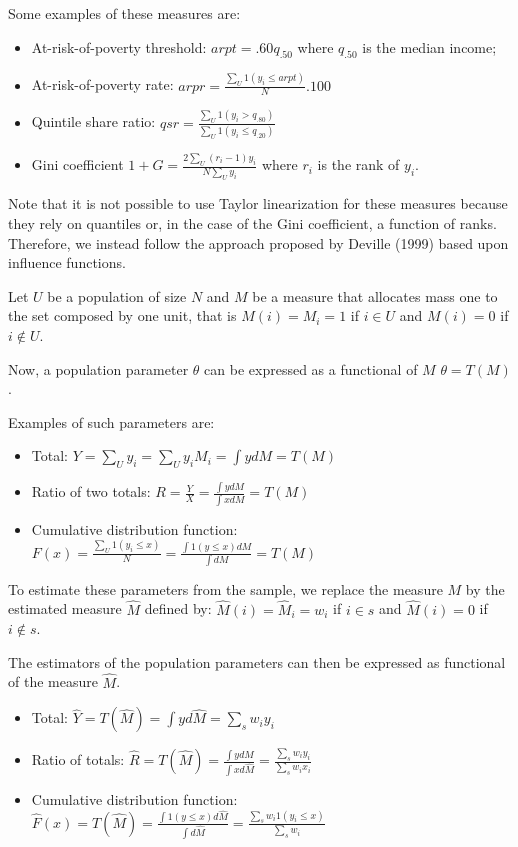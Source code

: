 \documentclass[
]{book}
\begin{document}
Some examples of these measures are:

\begin{itemize}
\item
  At-risk-of-poverty threshold:
  \(arpt=.60q_{.50}\) where \(q_{.50}\) is the median income;
\item
  At-risk-of-poverty rate:
  \(arpr=\frac{\sum_U 1(y_i \leq arpt)}{N}.100\)
\item
  Quintile share ratio:
  \(qsr=\frac{\sum_U 1(y_i>q_{.80})}{\sum_U 1(y_i\leq q_{.20})}\)
\item
  Gini coefficient
  \(1+G=\frac{2\sum_U (r_i-1)y_i}{N\sum_Uy_i}\)
  where \(r_i\) is the rank of \(y_i\).
\end{itemize}

Note that it is not possible to use Taylor linearization for these measures because they rely on quantiles or, in the case of the Gini coefficient, a function of ranks. Therefore, we instead follow the approach proposed by Deville (1999) based upon influence functions.

Let \(U\) be a population of size \(N\) and \(M\) be a measure that allocates mass one to the set composed by one unit, that is \(M(i)=M_i= 1\) if \(i\in U\) and \(M(i)=0\) if \(i\notin U\).

Now, a population parameter \(\theta\) can be expressed as a functional of \(M\)
\(\theta=T(M)\).

Examples of such parameters are:

\begin{itemize}
\item
  Total:
  \(Y=\sum_Uy_i=\sum_U y_iM_i=\int ydM=T(M)\)
\item
  Ratio of two totals:
  \(R=\frac{Y}{X}=\frac{\int y dM}{\int x dM}=T(M)\)
\item
  Cumulative distribution function:
  \(F(x)=\frac{\sum_U 1(y_i\leq x)}{N}=\frac{\int 1(y\leq x)dM}{\int{dM}}=T(M)\)
\end{itemize}

To estimate these parameters from the sample, we replace the measure \(M\) by the estimated measure \(\hat{M}\) defined by: \(\hat{M}(i)=\hat{M}_i= w_i\) if \(i\in s\) and \(\hat{M}(i)=0\) if \(i\notin s\).

The estimators of the population parameters can then be expressed as functional of the measure \(\hat{M}\).

\begin{itemize}
\item
  Total:
  \(\hat{Y}=T(\hat{M})=\int yd\hat{M}=\sum_s w_iy_i\)
\item
  Ratio of totals:
  \(\hat{R}=T(\hat{M})=\frac{\int y d\hat{M}}{\int x d\hat{M}}=\frac{\sum_s w_iy_i}{\sum_s w_ix_i}\)
\item
  Cumulative distribution function:
  \(\hat{F}(x)=T(\hat{M})=\frac{\int 1(y\leq x)d\hat{M}}{\int{d\hat{M}}}=\frac{\sum_s w_i 1(y_i\leq x)}{\sum_s w_i}\)
\end{itemize}
\end{document}
